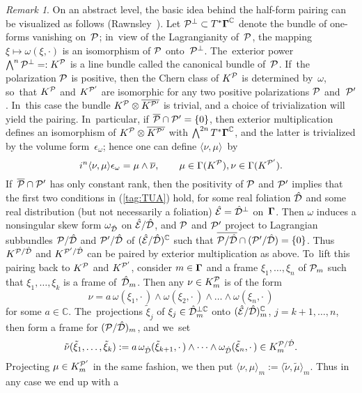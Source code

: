 \documentclass[12pt]{amsart}
\numberwithin{equation}{section}
\theoremstyle{remark}
\newtheorem{remark*}{Remark}
\newcommand\spr[2]{\langle #1,#2\rangle}
\newcommand\Omg{{\bigam}}   %
\newcommand\PP{{\Cal P}}
\newcommand\DD{{\Cal D}}
\newcommand\EE{{\Cal E}}
\newcommand\GG{{\PP'}}
\newcommand\hatDD{{\hat\DD}}
\newcommand\hatEE{\hat\EE}
\newcommand{\CC}{\C}
\newcommand{\bigam}{\mbox{\boldmath $\Gamma$}}
\newcommand{\C}{\mathbb C}
\begin{document}
\begin{remark*} On an abstract level, the basic idea behind  the half-form
pairing can be visualized as follows (Rawnsley~\cite{bib:RawnCMP}). Let
$\PP^\perp\subset T^*\Omg^\CC$ denote the bundle of one-forms vanishing
on~$\PP$; in~view of the Lagrangianity of~$\PP$, the mapping $\xi\mapsto\omega
(\xi,\cdot)$ is an isomorphism of $\PP$ onto~$\PP^\perp$. The~exterior power
$\bigwedge^n\PP^\perp=:K^\PP$ is a line bundle called the canonical bundle
of~$\PP$. If~the polarization $\PP$ is positive, then the Chern class of
$K^\PP$ is determined by~$\omega$, so~that $K^\PP$ and $K^\GG$ are isomorphic
for any two positive polarizations $\PP$ and~$\GG$. In~this case the bundle
$K^\PP\otimes\overline{K^\GG}$ is trivial, and a choice of trivialization will
yield the pairing. In~particular, if $\overline\PP\cap\GG=\{0\}$, then exterior
multiplication defines an isomorphism of $K^\PP\otimes\overline{K^\GG}$ with
$\bigwedge^{2n} T^*\Omg^\CC$, and the latter is trivialized by the volume
form~$\epsilon_\omega$; hence one can define $\spr\nu\mu$~by
$$ i^n \spr\nu\mu \epsilon_\omega = \mu\wedge\overline\nu, \qquad
\mu\in\Gamma(K^\PP), \nu\in\Gamma(K^\GG).  $$
If~$\overline\PP\cap\GG$ has only constant rank, then the positivity of $\PP$
and $\GG$ implies that the first two conditions in (\ref{tag:TUA}) hold, for
some real foliation $\hatDD$ and some real distribution (but not necessarily a
foliation) $\hatEE=\hatDD^\perp$ on~$\Omg$. Then $\omega$ induces a nonsingular
skew form $\omega_\hatDD$ on $\hatEE/\hatDD$, and $\PP$ and $\GG$ project to
Lagrangian subbundles $\PP/\hatDD$ and $\GG/\hatDD$ of $(\hatEE/\hatDD)^\CC$
such that $\overline{\PP/\hatDD}\cap(\GG/\hatDD)=\{0\}$. Thus $K^{\PP/\hatDD}$
and $K^{\GG/\hatDD}$ can be paired by exterior multiplication as above. To~lift
this pairing back to $K^\PP$ and $K^\GG$, consider $m\in \Omg$ and a frame
$\xi_1, \dots,\xi_n$ of $\PP_m$ such that $\xi_1,\dots,\xi_k$ is a frame
of~$\hatDD_m$. Then any $\nu\in K^\PP_m$ is of the form
$$ \nu = a\,\omega(\xi_1,\cdot\,)\wedge\omega(\xi_2,\cdot\,)\wedge\dots\wedge
\omega(\xi_n,\cdot\,)  $$
for some $a\in\CC$. The~projections $\tilde\xi_j$ of $\xi_j\in\hatDD_m^{\perp
\CC}$ onto $(\hatEE/\hatDD)_m^\CC$, $j=k+1,\dots,n$, then form a frame for
$(\PP/\hatDD)_m$, and we~set
$$ \tilde\nu(\tilde\xi_1,\dots,\tilde\xi_k) := a \,\omega_\hatDD(\tilde\xi
_{k+1},\cdot\,)\wedge \dots \wedge \omega_\hatDD(\tilde\xi_n,\cdot\,) \in
K_m^{\PP/\hatDD}.  $$
Projecting $\mu\in K^\GG_m$ in the same fashion, we then put $\spr\nu\mu_m:=
\spr{\tilde\nu}{\tilde\mu}_m$. Thus in any case we end up with a

\end{remark*}
\end{document}
